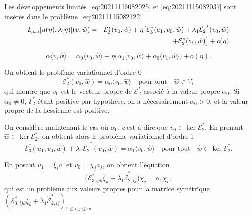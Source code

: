\documentclass[12pt, final]{amsart}
\begin{document}
Les développements limités~\eqref{eq:20211115082025} et
\eqref{eq:20211115082037} sont insérés dans le
problème~\eqref{eq:20211115082122}
\begin{eqnarray}
  \notag
  \mathcal E_{,uu}[u(\eta ), \lambda (\eta )](v, \hat{w})
  &=&\mathcal E_2^*(v_0, \hat{w})+\eta \bigl[\mathcal E_3^*(u_1, v_0, \hat{w})+\lambda _1\dot{\mathcal E_2}^*(v_0, \hat{w})\\
  &&+\mathcal E_2^*(v_1, \hat{w})\bigr]+o(\eta )
\end{eqnarray}

\begin{equation}
  \alpha\langle  v, \hat{w}\rangle =\alpha_0\langle v_0, \hat{w}\rangle +\eta \bigl(\alpha_1\langle  v_0, \hat{w}\rangle +\alpha_0\langle  v_1, \hat{w}\rangle \bigr)+o(\eta ).
\end{equation}

On obtient le problème variationnel d'ordre 0
\begin{equation}
  \mathcal E_2^*(v_0, \hat{w})=\alpha_0\langle v_0, \hat{w}\rangle \quad\text{pour tout}\quad\hat{w}\in V,
\end{equation}
qui montre que \(v_0\) est le vecteur propre de \(\mathcal E_2^*\) associé à la valeur
propre \(\alpha_0\). Si \(\alpha_0\neq 0\), \(\mathcal E_2^*\) étant positive par hypothèse, on a
nécessairement \(\alpha_0>0\), et la valeur propre de la hessienne est positive.

On considère maintenant le cas où \(\alpha_0\), c'est-à-dire que \(v_0\in\ker\mathcal E_2^*\). En
prenant \(\hat{w}\in\ker\mathcal E_2^*\), on obtient alors le problème variationnel d'ordre
1
\begin{equation}
  \mathcal E_3^*(u_1, v_0, \hat{w})+\lambda _1\dot{\mathcal E_2}^*(v_0, \hat{w})=\alpha_1\langle v_0, \hat{w}\rangle
  \quad\text{pour tout}\quad\hat{w}\in\ker\mathcal E_2^*.
\end{equation}

En posant \(u_1=\xi _ia_i\) et \(v_0=\chi _ja_j\), on obtient l'équation
\begin{equation}
  \bigl(\mathcal E_{3,ijk}^*\xi _k+\lambda _1\dot{\mathcal E}_{2, ij}^*\bigr)\chi _j=\alpha_1\chi _i,
\end{equation}
qui est un problème aux valeurs propres pour la matrice symétrique
\((\mathcal E_{3, ijk}^*\xi _k+\lambda _1\dot{\mathcal E}_{2,ij}^*)_{1\leq i, j\leq m}\)

\end{document}
